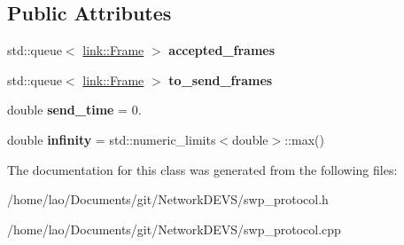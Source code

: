 \subsection*{Public Attributes}
\begin{DoxyCompactItemize}
\item 
std\+::queue$<$ \hyperlink{structlink_1_1Frame}{link\+::\+Frame} $>$ {\bfseries accepted\+\_\+frames}\hypertarget{classswp__protocol_a6ca21ef352c5c0386941af7ff47f889c}{}\label{classswp__protocol_a6ca21ef352c5c0386941af7ff47f889c}

\item 
std\+::queue$<$ \hyperlink{structlink_1_1Frame}{link\+::\+Frame} $>$ {\bfseries to\+\_\+send\+\_\+frames}\hypertarget{classswp__protocol_a83ea71f30f8d84f1248a48615ec3e869}{}\label{classswp__protocol_a83ea71f30f8d84f1248a48615ec3e869}

\item 
double {\bfseries send\+\_\+time} = 0.\hypertarget{classswp__protocol_a03c28f33ff015cccdccf7f082e7cd981}{}\label{classswp__protocol_a03c28f33ff015cccdccf7f082e7cd981}

\item 
double {\bfseries infinity} = std\+::numeric\+\_\+limits$<$double$>$\+::max()\hypertarget{classswp__protocol_a267d11a0dbb19b5699670232d802c93c}{}\label{classswp__protocol_a267d11a0dbb19b5699670232d802c93c}

\end{DoxyCompactItemize}


The documentation for this class was generated from the following files\+:\begin{DoxyCompactItemize}
\item 
/home/lao/\+Documents/git/\+Network\+D\+E\+V\+S/swp\+\_\+protocol.\+h\item 
/home/lao/\+Documents/git/\+Network\+D\+E\+V\+S/swp\+\_\+protocol.\+cpp\end{DoxyCompactItemize}
